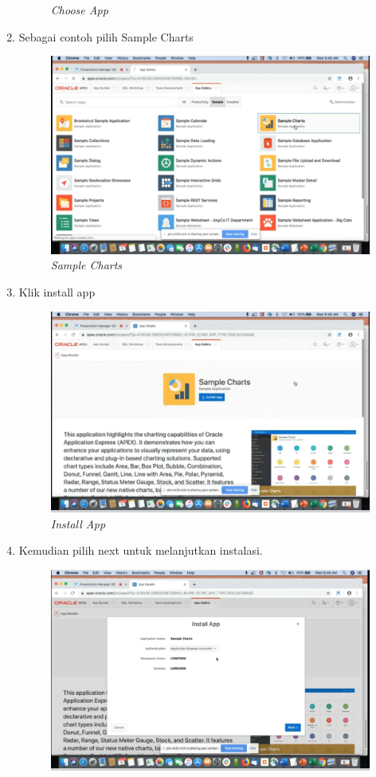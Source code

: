 \begin{enumerate}
\begin{figure}[H]
    \caption{\textit{Choose App}}
    \label{foto2}
\end{figure}
 \item Sebagai contoh pilih Sample Charts
 \begin{figure}[H]
    \centering
    \includegraphics[scale=0.5]{figures/c}
    \caption{\textit{Sample Charts}}
    \label{foto3}
\end{figure}
 \item Klik install app
 \begin{figure}[H]
    \centering
    \includegraphics[scale=0.5]{figures/d}
    \caption{\textit{Install App}}
    \label{foto4}
\end{figure}
 \item Kemudian pilih next untuk melanjutkan instalasi.
 \begin{figure}[H]
    \centering
    \includegraphics[scale=0.5]{figures/e}

\end{figure}
\end{enumerate}
